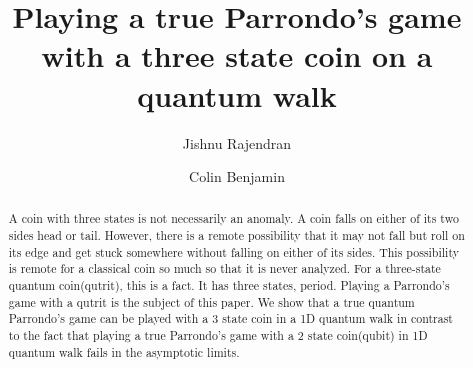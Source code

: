 \documentclass[english,aps,pra,amsmath,amssymb,showpacs,notitlepage,onecolumn]{revtex4-1}
\begin{document}
\title{Playing a true Parrondo's game with a three state coin on a quantum walk}
\author{Jishnu Rajendran}
\author{Colin Benjamin}
\begin{abstract}
A coin with three states is not necessarily an anomaly. A coin falls on either of its two sides head or tail. However, there is a remote possibility that it may not fall but roll on its edge and get stuck somewhere without falling on either of its sides. This possibility is remote for a classical coin so much so that it is never analyzed. For a three-state quantum coin(qutrit), this is a fact. It has three states, period. Playing a Parrondo's game with a qutrit is the subject of this paper. We show that a true quantum Parrondo's game can be played with a 3 state coin in a 1D quantum walk in contrast to the fact that playing a true Parrondo's game with a 2 state coin(qubit) in 1D quantum walk fails in the asymptotic limits.

\end{abstract}
\maketitle
\end{document}
